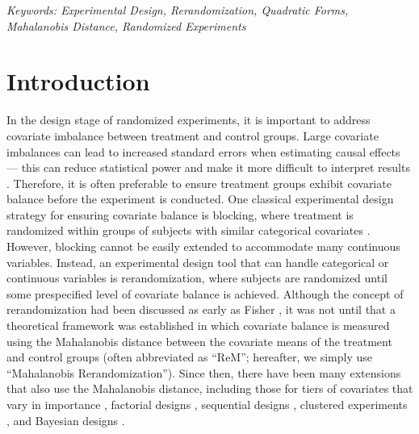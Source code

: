 \documentclass[11pt,twoside]{article}
\theoremstyle{definition}
\theoremstyle{remark}
\begin{document}
\noindent
{\it Keywords: Experimental Design, Rerandomization, Quadratic Forms, Mahalanobis Distance, Randomized Experiments} 

\bigskip 


\section{Introduction}

In the design stage of randomized experiments, it is important to address covariate imbalance between treatment and control groups. Large covariate imbalances can lead to increased standard errors when estimating causal effects --- this can reduce statistical power and make it more difficult to interpret results \citep{lachin1988statistical, senn1989covariate, lin2015pursuit, branson2022power}. Therefore, it is often preferable to ensure treatment groups exhibit covariate balance before the experiment is conducted. One classical experimental design strategy for ensuring covariate balance is blocking, where treatment is randomized within groups of subjects with similar categorical covariates \citep{box1978statistics, pashley2021insights}. However, blocking cannot be easily extended to accommodate many continuous variables. Instead, an experimental design tool that can handle categorical or continuous variables is rerandomization, where subjects are randomized until some prespecified level of covariate balance is achieved. Although the concept of rerandomization had been discussed as early as Fisher \citep{fisher1992arrangement}, it was not until \cite{morgan2012rerandomization} that a theoretical framework was established in which covariate balance is measured using the Mahalanobis distance between the covariate means of the treatment and control groups (often abbreviated as ``ReM''; hereafter, we simply use ``Mahalanobis Rerandomization''). Since then, there have been many extensions that also use the Mahalanobis distance, including those for tiers of covariates that vary in importance \citep{morgan2015rerandomization}, factorial designs \citep{branson2016improving, li2020rerandomization_2k}, sequential designs \citep{zhou2018sequential}, clustered experiments \citep{lu2023design}, and Bayesian designs \citep{liu2023bayesian}.
\end{document}
